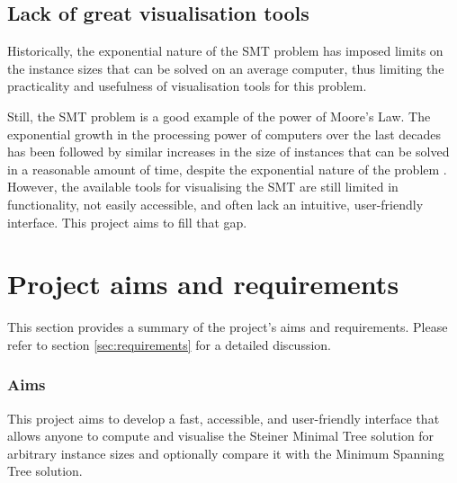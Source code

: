 \documentclass{l4proj}
\begin{document}
\subsection{Lack of great visualisation tools}
Historically, the exponential nature of the SMT problem has imposed limits on the instance sizes that can be solved on an average computer, thus limiting the practicality and usefulness of visualisation tools for this problem.

Still, the SMT problem is a good example of the power of Moore's Law. The exponential growth in the processing power of computers over the last decades has been followed by similar increases in the size of instances that can be solved in a reasonable amount of time, despite the exponential nature of the problem \citep{29ee725d11ac4584b72f7fe66c4326fa}.
However, the available tools for visualising the SMT are still limited in functionality, not easily accessible, and often lack an intuitive, user-friendly interface.
This project aims to fill that gap.





\section{Project aims and requirements}
This section provides a summary of the project's aims and requirements. Please refer to section \ref{sec:requirements} for a detailed discussion.

\subsubsection{Aims}
This project aims to develop a fast, accessible, and user-friendly interface that allows anyone to compute and visualise the Steiner Minimal Tree solution for arbitrary instance sizes and optionally compare it with the Minimum Spanning Tree solution.
\end{document}
